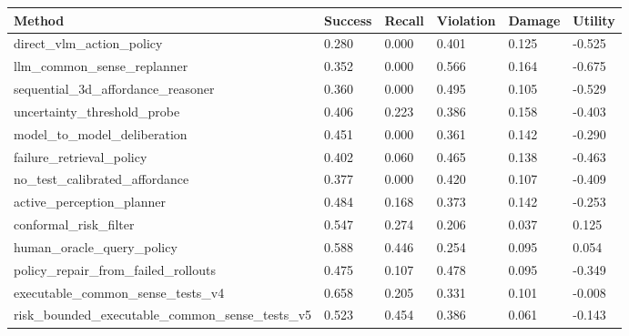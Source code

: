 \begin{tabular}{llllll}
\toprule
Method & Success & Recall & Violation & Damage & Utility \\
\midrule
direct\_vlm\_action\_policy & 0.280 & 0.000 & 0.401 & 0.125 & -0.525 \\
llm\_common\_sense\_replanner & 0.352 & 0.000 & 0.566 & 0.164 & -0.675 \\
sequential\_3d\_affordance\_reasoner & 0.360 & 0.000 & 0.495 & 0.105 & -0.529 \\
uncertainty\_threshold\_probe & 0.406 & 0.223 & 0.386 & 0.158 & -0.403 \\
model\_to\_model\_deliberation & 0.451 & 0.000 & 0.361 & 0.142 & -0.290 \\
failure\_retrieval\_policy & 0.402 & 0.060 & 0.465 & 0.138 & -0.463 \\
no\_test\_calibrated\_affordance & 0.377 & 0.000 & 0.420 & 0.107 & -0.409 \\
active\_perception\_planner & 0.484 & 0.168 & 0.373 & 0.142 & -0.253 \\
conformal\_risk\_filter & 0.547 & 0.274 & 0.206 & 0.037 & 0.125 \\
human\_oracle\_query\_policy & 0.588 & 0.446 & 0.254 & 0.095 & 0.054 \\
policy\_repair\_from\_failed\_rollouts & 0.475 & 0.107 & 0.478 & 0.095 & -0.349 \\
executable\_common\_sense\_tests\_v4 & 0.658 & 0.205 & 0.331 & 0.101 & -0.008 \\
risk\_bounded\_executable\_common\_sense\_tests\_v5 & 0.523 & 0.454 & 0.386 & 0.061 & -0.143 \\
\bottomrule
\end{tabular}
